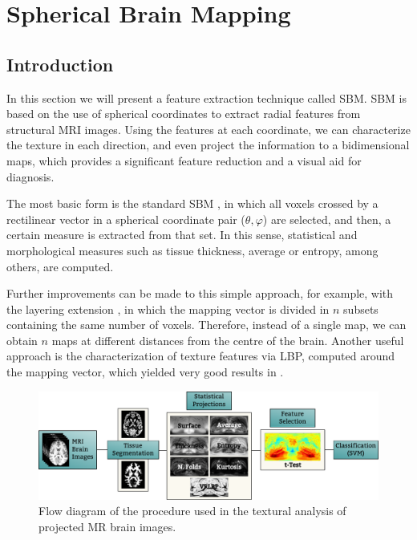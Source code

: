 \chapter{Spherical Brain Mapping}\label{ch:sbm}
\section{Introduction}
In this section we will present a feature extraction technique called \acf{SBM}. \ac{SBM} is based on the use of spherical coordinates to extract radial features from structural \ac{MRI} images. Using the features at each coordinate, we can characterize the texture in each direction, and even project the information to a bidimensional maps, which provides a significant feature reduction and a visual aid for diagnosis. 

The most basic form is the standard \ac{SBM} \cite{Martinez-Murcia2014225,Martinez-Murcia2015}, in which all voxels crossed by a rectilinear vector in a spherical coordinate pair ($\theta,\varphi$) are selected, and then, a certain measure is extracted from that set. In this sense, statistical and morphological measures such as tissue thickness, average or entropy, among others, are computed. 

Further improvements can be made to this simple approach, for example, with the layering extension \cite{Martinez-Murcia2015}, in which the mapping vector is divided in $n$ subsets containing the same number of voxels. Therefore, instead of a single map, we can obtain $n$ maps at different distances from the centre of the brain. Another useful approach is the characterization of texture features via \acf{LBP}, computed around the mapping vector, which yielded very good results in \cite{Martinez-MurciaVRLBP}.

\begin{figure}[htp]
	\centering
	\includegraphics[width=\textwidth]{Graphics/ch6/01-flowdiagram}
	\caption{Flow diagram of the procedure used in the textural analysis of projected MR brain images.}
	\label{fig:flowdiagram}
\end{figure}

